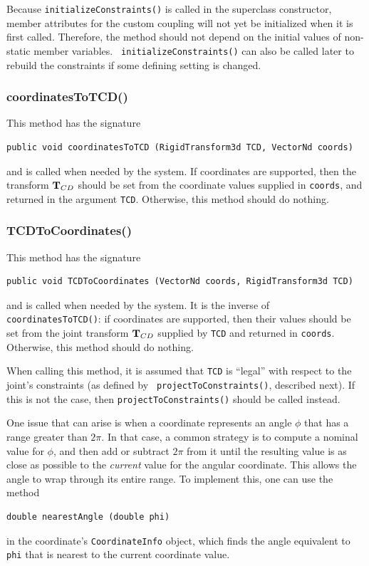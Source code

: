\begin{sideblock}
Because {\tt initializeConstraints()} is called in the superclass
constructor, member attributes for the custom coupling will not yet be
initialized when it is first called. Therefore, the method should not
depend on the initial values of non-static member variables.  {\tt
initializeConstraints()} can also be called later to rebuild the
constraints if some defining setting is changed.
\end{sideblock}

\subsubsection*{coordinatesToTCD()}

This method has the signature
\begin{lstlisting}[]
  public void coordinatesToTCD (RigidTransform3d TCD, VectorNd coords)
\end{lstlisting}
%
and is called when needed by the system. If coordinates are supported,
then the transform ${\bf T}_{CD}$ should be set from the coordinate values
supplied in {\tt coords}, and returned in the argument {\tt TCD}.
Otherwise, this method should do nothing.

\subsubsection*{TCDToCoordinates()}

This method has the signature
\begin{lstlisting}[]
  public void TCDToCoordinates (VectorNd coords, RigidTransform3d TCD)
\end{lstlisting}
%
and is called when needed by the system. It is the inverse of {\tt
coordinatesToTCD()}: if coordinates are supported, then their values
should be set from the joint transform ${\bf T}_{CD}$ supplied by {\tt TCD}
and returned in {\tt coords}. Otherwise, this method should do
nothing.

When calling this method, it is assumed that {\tt TCD} is ``legal''
with respect to the joint's constraints (as defined by {\tt
projectToConstraints()}, described next). If this is not the case,
then {\tt projectToConstraints()} should be called instead.

One issue that can arise is when a coordinate represents an angle
$\phi$ that has a range greater than $2 \pi$.  In that case, a common
strategy is to compute a nominal value for $\phi$, and then add or
subtract $2 \pi$ from it until the resulting value is as close as
possible to the {\it current} value for the angular coordinate.  This
allows the angle to wrap through its entire range. To implement this,
one can use the method 
\begin{lstlisting}[]
  double nearestAngle (double phi)
\end{lstlisting}
%
in the coordinate's {\tt CoordinateInfo} object,
which finds the angle equivalent to {\tt phi} that is nearest to the
current coordinate value.

